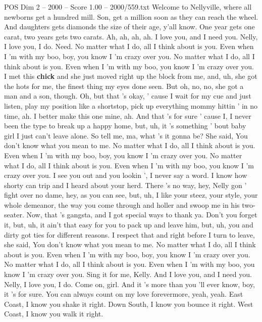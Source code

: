 \begin{textsample}{POS Dim 2 – 2000 – Score 1.00 – 2000/559.txt}  \label{ex:f2_pos_015}
Welcome to Nellyville, where all newborns get a hundred mill.
Son, get a million soon as they can reach the wheel.
And daughters gets diamonds the size of their age, y'all know.
One year gets one carat, two years gets two carats.
Ah, ah, ah, ah.
I love you, and I need you.
Nelly, I love you, I do.
Need.
No matter what I do, all I think about is you.
Even when I 'm with my boo, boy, you know I 'm crazy over you.
No matter what I do, all I think about is you.
Even when I 'm with my boo, you know I 'm crazy over you.
I met this \textbf{chick} and she just moved right up the block from me, and, uh, she got the hots for me, the finest thing my eyes done seen.
But oh, no, no, she got a man and a son, though.
Oh, but that 's okay, ' cause I wait for my cue and just listen, play my position like a shortstop, pick up everything mommy hittin ' in no time, ah.
I better make this one mine, ah.
And that 's for sure ' cause I, I never been the type to break up a happy home, but, uh, it 's something ' bout baby girl I just can't leave alone.
So tell me, ma, what 's it gonna be?
She said, You don't know what you mean to me.
No matter what I do, all I think about is you.
Even when I 'm with my boo, boy, you know I 'm crazy over you.
No matter what I do, all I think about is you.
Even when I 'm with my boo, you know I 'm crazy over you.
I see you out and you lookin ', I never say a word.
I know how shorty can trip and I heard about your herd.
There 's no way, hey, Nelly gon ' fight over no dame, hey, as you can see, but, uh, I like your steez, your style, your whole demeanor, the way you come through and holler and swoop me in his two-seater.
Now, that 's gangsta, and I got special ways to thank ya.
Don't you forget it, but, uh, it ain't that easy for you to pack up and leave him, but, uh, you and dirty got ties for different reasons.
I respect that and right before I turn to leave, she said, You don't know what you mean to me.
No matter what I do, all I think about is you.
Even when I 'm with my boo, boy, you know I 'm crazy over you.
No matter what I do, all I think about is you.
Even when I 'm with my boo, you know I 'm crazy over you.
Sing it for me, Kelly.
And I love you, and I need you.
Nelly, I love you, I do.
Come on, girl.
And it 's more than you 'll ever know, boy, it 's for sure.
You can always count on my love forevermore, yeah, yeah.
East Coast, I know you shake it right.
Down South, I know you bounce it right.
West Coast, I know you walk it right.

\end{textsample}
